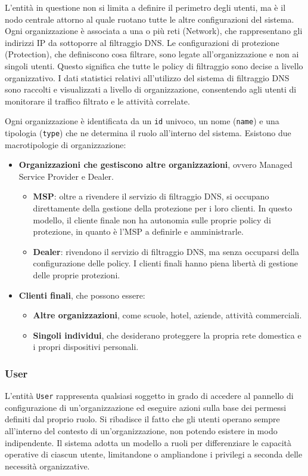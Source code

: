 L'entità in questione non si limita a definire il perimetro degli utenti, ma è il nodo centrale attorno al quale ruotano tutte le altre configurazioni del sistema. Ogni organizzazione è associata a una o più reti (Network), che rappresentano gli indirizzi IP da sottoporre al filtraggio DNS. Le configurazioni di protezione (Protection), che definiscono cosa filtrare, sono legate all'organizzazione e non ai singoli utenti. Questo significa che tutte le policy di filtraggio sono decise a livello organizzativo. I dati statistici relativi all’utilizzo del sistema di filtraggio DNS sono raccolti e visualizzati a livello di organizzazione, consentendo agli utenti di monitorare il traffico filtrato e le attività correlate.

Ogni organizzazione è identificata da un \texttt{id} univoco, un nome (\texttt{name}) e una tipologia (\texttt{type}) che ne determina il ruolo all'interno del sistema. Esistono due macrotipologie di organizzazione:
\begin{itemize}
  \item \textbf{Organizzazioni che gestiscono altre organizzazioni}, ovvero Managed Service Provider e Dealer.
    \begin{itemize}
      \item \textbf{MSP}: oltre a rivendere il servizio di filtraggio DNS, si occupano direttamente della gestione della protezione per i loro clienti. In questo modello, il cliente finale non ha autonomia sulle proprie policy di protezione, in quanto è l'MSP a definirle e amministrarle.
      \item \textbf{Dealer}: rivendono il servizio di filtraggio DNS, ma senza occuparsi della configurazione delle policy. I clienti finali hanno piena libertà di gestione delle proprie protezioni.
    \end{itemize}
  \item \textbf{Clienti finali}, che possono essere:
    \begin{itemize}
      \item \textbf{Altre organizzazioni}, come scuole, hotel, aziende, attività commerciali.
      \item \textbf{Singoli individui}, che desiderano proteggere la propria rete domestica e i propri dispositivi personali.
    \end{itemize}
\end{itemize}

\subsubsection{User}
L'entità \texttt{User} rappresenta qualsiasi soggetto in grado di accedere al pannello di configurazione di un'organizzazione ed eseguire azioni sulla base dei permessi definiti dal proprio ruolo. Si ribadisce il fatto che gli utenti operano sempre all'interno del contesto di un'organizzazione, non potendo esistere in modo indipendente. Il sistema adotta un modello a ruoli per differenziare le capacità operative di ciascun utente, limitandone o ampliandone i privilegi a seconda delle necessità organizzative.

